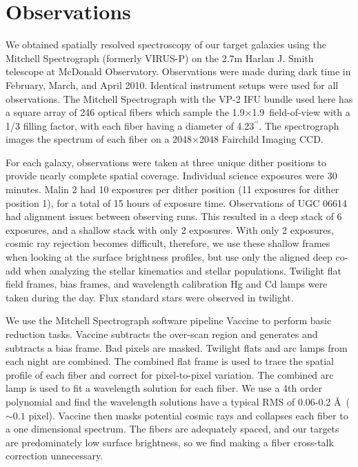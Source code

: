 \documentclass{emulateapj}
\def\arcsec{$^{\prime\prime}$}
\begin{document}

\section{Observations}

We obtained spatially resolved spectroscopy of our target galaxies using the Mitchell Spectrograph (formerly VIRUS-P)\citep{Hill08} on the 2.7m Harlan J. Smith telescope at McDonald Observatory.  Observations were made during dark time in February, March, and April 2010.  Identical instrument setups were used for all observations.  The Mitchell Spectrograph with the VP-2 IFU bundle used here has a square array of 246 optical fibers which sample the 1.9\arcmin$\times$1.9\arcmin\ field-of-view with a 1/3 filling factor, with each fiber having a diameter of 4.23\arcsec.  The spectrograph images the spectrum of each fiber on a 2048$\times$2048 Fairchild Imaging CCD.  

For each galaxy, observations were taken at three unique dither positions to provide nearly complete spatial coverage.  Individual science exposures were 30 minutes.  Malin 2 had 10 exposures per dither position (11 exposures for dither position 1), for a total of 15 hours of exposure time.  Observations of UGC 06614 had alignment issues between observing runs.  This resulted in a deep stack of 6 exposures, and a shallow stack with only 2 exposures.  With only 2 exposures, cosmic ray rejection becomes difficult, therefore, we use these shallow frames when looking at the surface brightness profiles, but use only the aligned deep co-add when analyzing the stellar kinematics and stellar populations. Twilight flat field frames, bias frames, and wavelength calibration Hg and Cd lamps were taken during the day.  Flux standard stars were observed in twilight.  


We use the Mitchell Spectrograph software pipeline Vaccine \citep{Adams2011} to perform basic reduction tasks.  Vaccine subtracts the over-scan region and generates and subtracts a bias frame.  Bad pixels are masked.  Twilight flats and arc lamps from each night are combined.  The combined flat frame is used to trace the spatial profile of each fiber and correct for pixel-to-pixel variation.  The combined arc lamp is used to fit a wavelength solution for each fiber.  We use a 4th order polynomial and find the wavelength solutions have a typical RMS of 0.06-0.2 \AA\ ($\sim0.1$ pixel).  Vaccine then masks potential cosmic rays and collapses each fiber to a one dimensional spectrum.  The fibers are adequately spaced, and our targets are predominately low surface brightness, so we find making a fiber cross-talk correction unnecessary.
\end{document}
